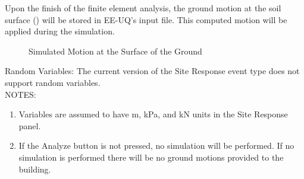 Upon the finish of the finite element analysis, the ground motion at the soil surface () will be stored in EE-UQ's input file.
This computed motion will be applied during the simulation.

\begin{figure}[!htbp]
  \caption{Simulated Motion at the Surface of the Ground}
  \label{fig:s3hark4}
\end{figure}

Random Variables: The current version of the Site Response event type does not support random variables.\\

NOTES: 
\begin{enumerate}
\item Variables are assumed to have m, kPa, and kN units in the Site Response panel.
\item If the Analyze button is not pressed, no simulation will be performed. If no simulation is performed there will be no ground motions provided to the building.
\end{enumerate}
